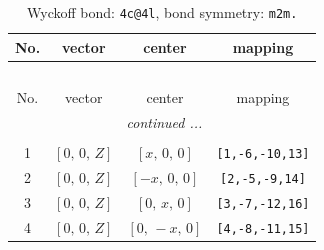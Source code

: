 \documentclass[fleqn,8pt]{jsarticle}
\begin{document}
\renewcommand{\arraystretch}{1.2}
\begin{longtable}{cccc}
\caption{Wyckoff bond: {\tt 4c@4l}, bond symmetry: {\tt m2m.}}
 \\
 \hline \hline
No. & vector & center & mapping \\ \hline \endfirsthead

\multicolumn{3}{l}{\tablename\ \thetable{}} \\
 \hline \hline
No. & vector & center & mapping \\ \hline \endhead

 \hline \hline
\multicolumn{3}{r}{\footnotesize\it continued ...} \\ \endfoot

 \hline \hline
\multicolumn{3}{r}{} \\ \endlastfoot

1 & $\left[ 0,\, 0,\, Z \right]$ & $\left[ x,\, 0,\, 0 \right]$ & {\tt [1,-6,-10,13]} \\ \hline
2 & $\left[ 0,\, 0,\, Z \right]$ & $\left[ - x,\, 0,\, 0 \right]$ & {\tt [2,-5,-9,14]} \\ \hline
3 & $\left[ 0,\, 0,\, Z \right]$ & $\left[ 0,\, x,\, 0 \right]$ & {\tt [3,-7,-12,16]} \\ \hline
4 & $\left[ 0,\, 0,\, Z \right]$ & $\left[ 0,\, - x,\, 0 \right]$ & {\tt [4,-8,-11,15]} \\
\end{longtable}
\renewcommand{\arraystretch}{1.2}
\end{document}
